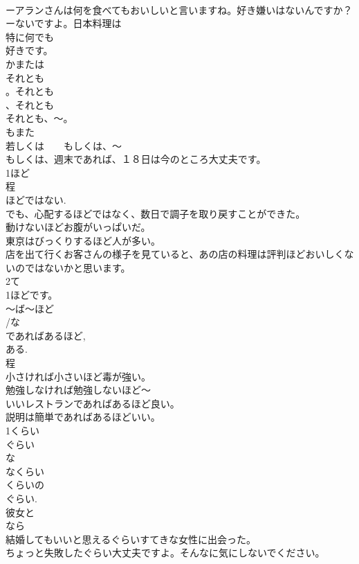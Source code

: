 \documentclass[8pt]{extreport}
\begin{document}
\begin{CJK}{UTF8}{min}
\\	ーアランさんは何を食べてもおいしいと言いますね。好き嫌いはないんですか？
\\	ーないですよ。日本料理は
\\	特に何でも
\\	好きです。	
\\	かまたは
\\	それとも
\\	。それとも
\\	、それとも
\\	それとも、～。
\\	もまた　
\\	若しくは　　もしくは、～
\\	もしくは、週末であれば、１８日は今のところ大丈夫です。
\\	1ほど
\\	程 
\\	ほどではない. 
\\	でも、心配するほどではなく、数日で調子を取り戻すことができた。
\\	動けないほどお腹がいっぱいだ。 
\\	東京はびっくりするほど人が多い。
\\	店を出て行くお客さんの様子を見ていると、あの店の料理は評判ほどおいしくないのではないかと思います。
\\	2て
\\	1ほどです。
\\	～ば～ほど
\\	/な
\\	であればあるほど, 
\\	ある.
\\	程　
\\	小さければ小さいほど毒が強い。　
\\	勉強しなければ勉強しないほど～
\\	いいレストランであればあるほど良い。
\\	説明は簡単であればあるほどいい。
\\	1くらい
\\	ぐらい
\\	な
\\	なくらい
\\	くらいの
\\	ぐらい. 
\\	彼女と
\\	なら
\\	結婚してもいいと思えるぐらいすてきな女性に出会った。
\\	ちょっと失敗したぐらい大丈夫ですよ。そんなに気にしないでください。

\end{CJK}
\end{document}
